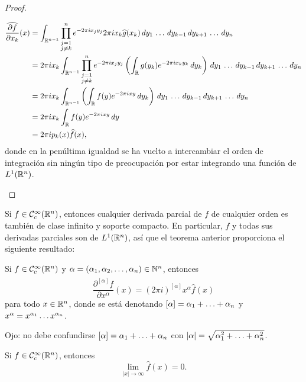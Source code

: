 \documentclass[a4paper, 11pt, oneside]{report}
\begin{document}
\begin{proof}
\begin{enumerate}
\[\begin{aligned}[t]
      \widehat{\frac{\partial f}{\partial x_k}}(x) &=  \int_{\mathbb R^{n-1}}\prod_{\substack{j = 1 \\ j \neq k}}^n e^{-2\pi i x_jy_j} 2\pi i x_k \widehat{g}(x_k) \, dy_1 \, \mathellipsis \, dy_{k-1} \, dy_{k+1} \, \mathellipsis \, dy_n \\
      &= 2 \pi i x_k \int_{\mathbb R^{n-1}}\prod_{\substack{j = 1 \\ j \neq k}}^n e^{-2\pi i x_jy_j}\left(\int_{\mathbb R}g(y_k)e^{-2\pi ix_ky_k} \, dy_k\right) \, dy_1 \, \mathellipsis \, dy_{k-1} \, dy_{k+1} \, \mathellipsis \, dy_n \\
      &= 2 \pi i x_k \int_{\mathbb R^{n-1}}\left( \int_\mathbb R f(y)e^{-2\pi i xy} \, dy_k\right)\, dy_1 \, \mathellipsis \, dy_{k-1} \, dy_{k+1} \, \mathellipsis \, dy_n \\
      &= 2\pi i x_k \int_{\mathbb R} f(y)e^{-2\pi i xy} \, dy \\
      &= 2\pi i p_k(x)\widehat{f}(x),
    \end{aligned}\]
    donde en la penúltima igualdad se ha vuelto a intercambiar el orden de integración sin ningún tipo de preocupación por estar integrando una función de $L^1(\mathbb R^n)$. \qedhere
  \end{enumerate}
\end{proof}

Si $f \in \mathcal{C}^\infty_c(\mathbb R^n)$, entonces cualquier derivada parcial de $f$ de cualquier orden es también de clase infinito y soporte compacto. En particular, $f$ y todas sus derivadas parciales son de $L^1(\mathbb R^n)$, así que el teorema anterior proporciona el siguiente resultado:

\begin{corollary}\label{cor:3.1.9}
  Si $f \in \mathcal{C}^\infty_c(\mathbb R^n)$ y $\alpha = (\alpha_1,\alpha_2,\mathellipsis,\alpha_n) \in \mathbb N^n$, entonces
  \[\widehat{\frac{\partial^{[\alpha]}f}{\partial x^\alpha}}(x) = (2\pi i)^{[\alpha]}x^\alpha \widehat{f}(x)\]
  para todo $x \in \mathbb R^n$, donde se está denotando $[\alpha] = \alpha_1+\mathellipsis+\alpha_n$ y $x^\alpha = x^{\alpha_1}\mathellipsis x^{\alpha_n}$.
\end{corollary}

Ojo: no debe confundirse $[\alpha] = \alpha_1+\mathellipsis+\alpha_n$ con $|\alpha| = \sqrt{\alpha_1^2+\mathellipsis+\alpha_n^2}$.

\begin{proposition}
  Si $f \in \mathcal{C}^\infty_c(\mathbb R^n)$, entonces
  \[\lim_{|x| \to \infty} \widehat{f}(x) = 0.\]
\end{proposition}
\end{document}
